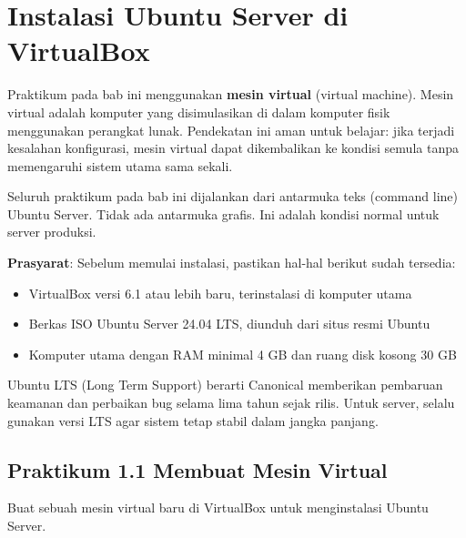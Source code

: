 \section{Instalasi Ubuntu Server di VirtualBox}
\label{sec:installation}

Praktikum pada bab ini menggunakan \textbf{mesin virtual} (virtual machine). Mesin
virtual adalah komputer yang disimulasikan di dalam komputer fisik menggunakan perangkat
lunak. Pendekatan ini aman untuk belajar: jika terjadi kesalahan konfigurasi, mesin
virtual dapat dikembalikan ke kondisi semula tanpa memengaruhi sistem utama sama sekali.

\begin{notebox}
Seluruh praktikum pada bab ini dijalankan dari antarmuka teks (command line) Ubuntu
Server. Tidak ada antarmuka grafis. Ini adalah kondisi normal untuk server produksi.
\end{notebox}

\textbf{Prasyarat}: Sebelum memulai instalasi, pastikan hal-hal berikut sudah tersedia:

\begin{itemize}
    \item VirtualBox versi 6.1 atau lebih baru, terinstalasi di komputer utama
    \item Berkas ISO Ubuntu Server 24.04 LTS, diunduh dari situs resmi Ubuntu
    \item Komputer utama dengan RAM minimal 4 GB dan ruang disk kosong 30 GB
\end{itemize}

\begin{tipbox}
Ubuntu LTS (Long Term Support) berarti Canonical memberikan pembaruan keamanan dan
perbaikan bug selama lima tahun sejak rilis. Untuk server, selalu gunakan versi LTS
agar sistem tetap stabil dalam jangka panjang.
\end{tipbox}

\subsection*{Praktikum 1.1 Membuat Mesin Virtual}

Buat sebuah mesin virtual baru di VirtualBox untuk menginstalasi Ubuntu Server.

